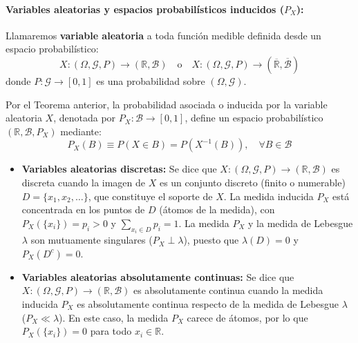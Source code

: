 \paragraph{Variables aleatorias y espacios probabilísticos inducidos ($P_X$):}
Llamaremos \textbf{variable aleatoria} a toda función medible definida desde un espacio probabilístico:
\[
    X : (\Omega, \mathcal{G}, P) \to (\mathbb{R}, \mathcal{B}) \quad \text{o} \quad X : (\Omega, \mathcal{G}, P) \to (\overline{\mathbb{R}}, \overline{\mathcal{B}})
\]
donde $P : \mathcal{G} \to [0, 1]$ es una probabilidad sobre $(\Omega, \mathcal{G})$.

Por el Teorema anterior, la probabilidad asociada o inducida por la variable aleatoria $X$, denotada por $P_X : \mathcal{B} \to [0, 1]$, define un espacio probabilístico $(\mathbb{R}, \mathcal{B}, P_X)$ mediante:
\[
    P_X(B) \equiv P(X \in B) = P\left( X^{-1}(B) \right), \quad \forall B \in \mathcal{B}
\]

\begin{center}
    \vspace{0.2cm}
    \vspace{0.2cm}
\end{center}

\begin{itemize}
    \item \textbf{Variables aleatorias discretas:}
    Se dice que $X : (\Omega, \mathcal{G}, P) \to (\mathbb{R}, \mathcal{B})$ es discreta cuando la imagen de $X$ es un conjunto discreto (finito o numerable) $D = \{x_1, x_2, \dots\}$, que constituye el soporte de $X$.
    La medida inducida $P_X$ está concentrada en los puntos de $D$ (átomos de la medida), con $P_X(\{x_i\}) = p_i > 0$ y $\sum_{x_i \in D} p_i = 1$. La medida $P_X$ y la medida de Lebesgue $\lambda$ son mutuamente singulares ($P_X \perp \lambda$), puesto que $\lambda(D) = 0$ y $P_X(D^c) = 0$.

    \item \textbf{Variables aleatorias absolutamente continuas:}
    Se dice que $X : (\Omega, \mathcal{G}, P) \to (\mathbb{R}, \mathcal{B})$ es absolutamente continua cuando la medida inducida $P_X$ es absolutamente continua respecto de la medida de Lebesgue $\lambda$ ($P_X \ll \lambda$).
    En este caso, la medida $P_X$ carece de átomos, por lo que $P_X(\{x_i\}) = 0$ para todo $x_i \in \mathbb{R}$.
\end{itemize}

